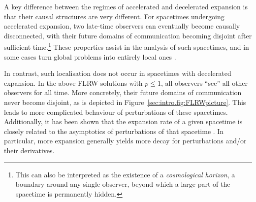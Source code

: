 \documentclass{article}
\begin{document}
A key difference between the regimes of accelerated and decelerated expansion is that their causal structures are very different. For spacetimes undergoing accelerated expansion, two late-time observers can eventually become causally disconnected, with their future domains of communication becoming disjoint after sufficient time.\footnote{This can also be interpreted as the existence of a \emph{cosmological horizon}, a boundary around any single observer, beyond which a large part of the spacetime is permanently hidden.} These properties assist in the analysis of such spacetimes, and in some cases turn global problems into entirely local ones \cite{Fri:deSitterstab:86}.

In contrast, such localisation does not occur in spacetimes with decelerated expansion. In the above FLRW solutions with $p \leq 1$, all observers ``see'' all other observers for all time. More concretely, their future domains of communication never become disjoint, as is depicted in Figure~\ref{sec:intro.fig:FLRWpicture}. This leads to more complicated behaviour of perturbations of these spacetimes. Additionally, it has been shown that the expansion rate of a given spacetime is closely related to the asymptotics of perturbations of that spacetime \cite{Rin:powerlaw:09}. In particular, more expansion generally yields more decay for perturbations and/or their derivatives.
\end{document}
